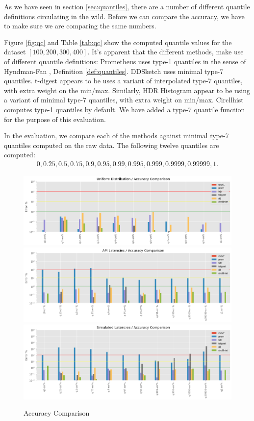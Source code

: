 \documentclass{article}
\theoremstyle{plain}
\theoremstyle{remark}
\begin{document}
As we have seen in section \ref{sec:quantiles}, there are a number of different quantile definitions
circulating in the wild. Before we can compare the accuracy, we have to make sure we are comparing
the same numbers.

Figure \ref{fig:qc} and Table \ref{tab:qc} show the computed quantile values for the dataset $[100,
  200, 300, 400]$. It's apparent that the different methods, make use of different quantile
definitions: Prometheus uses type-1 quantiles in the sense of Hyndman-Fan \cite{HF1996}, Definition
\ref{def:quantiles}.  DDSketch uses minimal type-7 quantiles.  t-digest appears to be uses a variant
of interpolated type-7 quantiles, with extra weight on the min/max.  Similarly, HDR Histogram appear
to be using a variant of minimal type-7 quantiles, with extra weight on min/max.  Circllhist
computes type-1 quantiles by default. We have added a type-7 quantile function for the purpose of
this evaluation.

In the evaluation, we compare each of the methods against minimal type-7 quantiles computed on the
raw data. The following twelve quantiles are computed:
\begin{align*}
 0, 0.25, 0.5, 0.75, 0.9, 0.95, 0.99, 0.995, 0.999, 0.9999, 0.99999, 1.
\end{align*}

\begin{figure}
  \includegraphics[width=\textwidth]{evaluation/images/Uniform_Distribution_accuracy.png}
  \includegraphics[width=\textwidth]{evaluation/images/API_Latencies_accuracy.png}
  \includegraphics[width=\textwidth]{evaluation/images/Simulated_Latencies_accuracy.png}
  \caption{Accuracy Comparison}
  \label{fig:acc}
\end{figure}
\end{document}
